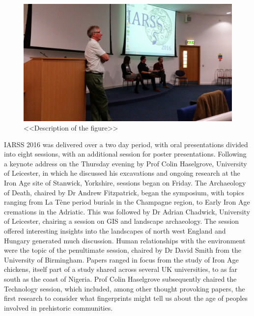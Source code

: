 \documentclass[ngerman,english]{ijsra}
\begin{document}
\begin{figure}
\centering
\includegraphics[width=\linewidth]{figures/IARSS_Session}
\caption{<<Description of the figure>>}
\label{fig:IARSS_Session}
\end{figure} 

IARSS 2016 was delivered over a two day period, with oral presentations divided into eight sessions, with an additional session for poster presentations. Following a keynote address on the Thursday evening by Prof Colin Haselgrove, University of Leicester, in which he discussed his excavations and ongoing research at the Iron Age site of Stanwick, Yorkshire, sessions began on Friday. The Archaeology of Death, chaired by Dr Andrew Fitzpatrick, began the symposium, with topics ranging from La Tène period burials in the Champagne region, to Early Iron Age cremations in the Adriatic. This was followed by Dr Adrian Chadwick, University of Leicester, chairing a session on GIS and landscape archaeology. The session offered interesting insights into the landscapes of north west England and Hungary generated much discussion. Human relationships with the environment were the topic of the penultimate session, chaired by Dr David Smith from the University of Birmingham. Papers ranged in focus from the study of Iron Age chickens, itself part of a study shared across several UK universities, to as far south as the coast of Nigeria. Prof Colin Haselgrove subsequently chaired the Technology session, which included, among other thought provoking papers, the first research to consider what fingerprints might tell us about the age of peoples involved in prehistoric communities.
\end{document}
